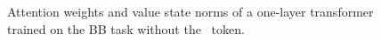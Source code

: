 \begin{figure}[h]
\begin{minipage}{0.35\textwidth}
  \end{minipage}
\caption{\small Attention weights and value state norms of a one-layer transformer trained on the BB task without the \bos~token.}
  \label{appfigure:no-bos-extreme}
  \vspace{-1em}
\end{figure}






